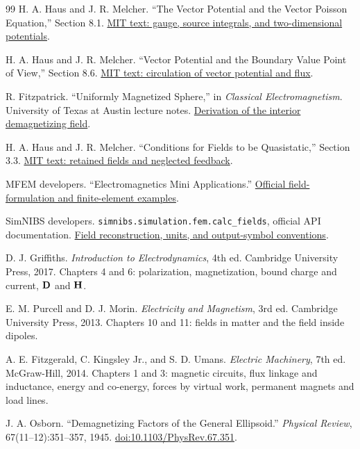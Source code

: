 \begin{thebibliography}{99}
 H. A. Haus and J. R. Melcher. ``The Vector Potential and the Vector Poisson Equation,'' Section 8.1. \href{https://web.mit.edu/6.013_book/www/chapter8/8.1.html}{MIT text: gauge, source integrals, and two-dimensional potentials}.

 H. A. Haus and J. R. Melcher. ``Vector Potential and the Boundary Value Point of View,'' Section 8.6. \href{https://web.mit.edu/6.013_book/www/chapter8/8.6.html}{MIT text: circulation of vector potential and flux}.

 R. Fitzpatrick. ``Uniformly Magnetized Sphere,'' in \emph{Classical Electromagnetism}. University of Texas at Austin lecture notes. \href{https://farside.ph.utexas.edu/teaching/jk1/Electromagnetism/node61.html}{Derivation of the interior demagnetizing field}.

 H. A. Haus and J. R. Melcher. ``Conditions for Fields to be Quasistatic,'' Section 3.3. \href{https://web.mit.edu/6.013_book/www/chapter3/3.3.html}{MIT text: retained fields and neglected feedback}.

 MFEM developers. ``Electromagnetics Mini Applications.'' \href{https://mfem.org/electromagnetics/}{Official field-formulation and finite-element examples}.

 SimNIBS developers. \texttt{simnibs.simulation.fem.calc\_fields}, official API documentation. \href{https://simnibs.github.io/simnibs/build/html/documentation/python_lib/auto/simnibs.simulation.fem.calc_fields.html}{Field reconstruction, units, and output-symbol conventions}.


 D. J. Griffiths. \emph{Introduction to Electrodynamics}, 4th ed. Cambridge University Press, 2017. Chapters 4 and 6: polarization, magnetization, bound charge and current, $\mathbf{D}$ and $\mathbf{H}$.

 E. M. Purcell and D. J. Morin. \emph{Electricity and Magnetism}, 3rd ed. Cambridge University Press, 2013. Chapters 10 and 11: fields in matter and the field inside dipoles.

 A. E. Fitzgerald, C. Kingsley Jr., and S. D. Umans. \emph{Electric Machinery}, 7th ed. McGraw-Hill, 2014. Chapters 1 and 3: magnetic circuits, flux linkage and inductance, energy and co-energy, forces by virtual work, permanent magnets and load lines.

 J. A. Osborn. ``Demagnetizing Factors of the General Ellipsoid.'' \emph{Physical Review}, 67(11--12):351--357, 1945. \href{https://doi.org/10.1103/PhysRev.67.351}{doi:10.1103/PhysRev.67.351}.


\end{thebibliography}
